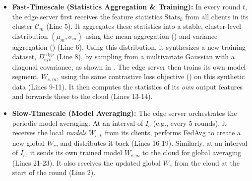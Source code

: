\begin{itemize}
    \item \textbf{Fast-Timescale (Statistics Aggregation \& Training):} In every round $t$, the edge server first receives the feature statistics $\text{Stats}_k$ from all clients in its cluster $\mathcal{C}_m$ (Line 5). It aggregates these statistics into a stable, cluster-level distribution $(\mu_m, \sigma_m)$ using the mean aggregation () and variance aggregation () (Line 6). Using this distribution, it synthesizes a new training dataset, $D_{\text{syn}}^{\text{edge}}$ (Line 8), by sampling from a multivariate Gaussian with a diagonal covariance, as shown in . The edge server then trains its own model segment, $W_{e,m}$, using the same contrastive loss objective () on this synthetic data (Lines 9-11). It then computes the statistics of its \textit{own} output features and forwards these to the cloud (Lines 13-14).

    \item \textbf{Slow-Timescale (Model Averaging):} The edge server orchestrates the periodic model averaging. At an interval of $I_c$ (e.g., every 5 rounds), it receives the local \textit{models} $W_{c,k}$ from its clients, performs FedAvg to create a new global $W_c$, and distributes it back (Lines 16-19). Similarly, at an interval of $I_e$, it sends its own trained model $W_{e,m}$ to the cloud for global averaging (Lines 21-23). It also receives the updated global $W_e$ from the cloud at the start of the round (Line 2).
\end{itemize}

